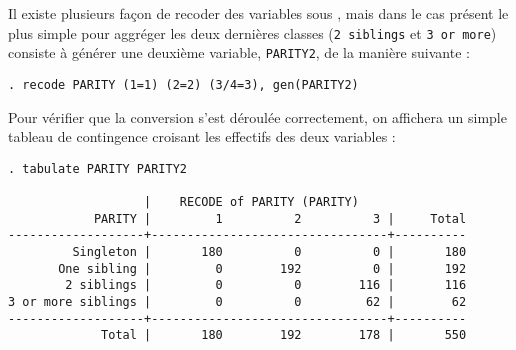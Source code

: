 Il existe plusieurs façon de recoder des variables sous \Stata, mais dans le
cas présent le plus simple pour aggréger les deux dernières classes
(\texttt{2 siblings} et \texttt{3 or more}) consiste à générer une deuxième
variable, \texttt{PARITY2}, de la manière suivante :
\begin{verbatim}
. recode PARITY (1=1) (2=2) (3/4=3), gen(PARITY2)
\end{verbatim}
Pour vérifier que la conversion s'est déroulée correctement, on affichera un
simple tableau de contingence croisant les effectifs des deux variables :
\begin{verbatim}
. tabulate PARITY PARITY2

                   |    RECODE of PARITY (PARITY)
            PARITY |         1          2          3 |     Total
-------------------+---------------------------------+----------
         Singleton |       180          0          0 |       180 
       One sibling |         0        192          0 |       192 
        2 siblings |         0          0        116 |       116 
3 or more siblings |         0          0         62 |        62 
-------------------+---------------------------------+----------
             Total |       180        192        178 |       550
\end{verbatim}

